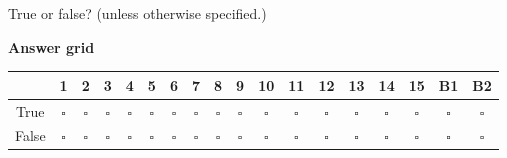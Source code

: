 \documentclass[a4paper]{article}
\begin{document}
\pagestyle{empty}
\thispagestyle{fancy}

True or false? (unless otherwise specified.)

\begin{center}
    \textbf{Answer grid}\par\smallskip

    \smallskip
    \normalsize
    \renewcommand{\arraystretch}{1.35}
    \begin{tabular}{|c|*{17}{c|}}
        \hline
        & 1 & 2 & 3 & 4 & 5 & 6 & 7 & 8 & 9 & 10 & 11 & 12 & 13 & 14 & 15 & B1 & B2 \\
        \hline
        True  & $\square$ & $\square$ & $\square$ & $\square$ & $\square$ & $\square$ & $\square$ & $\square$ & $\square$ & $\square$ & $\square$ & $\square$ & $\square$ & $\square$ & $\square$ & $\square$ & $\square$ \\
        False & $\square$ & $\square$ & $\square$ & $\square$ & $\square$ & $\square$ & $\square$ & $\square$ & $\square$ & $\square$ & $\square$ & $\square$ & $\square$ & $\square$ & $\square$ & $\square$ & $\square$ \\
        \hline
    \end{tabular}
\end{center}
\end{document}
